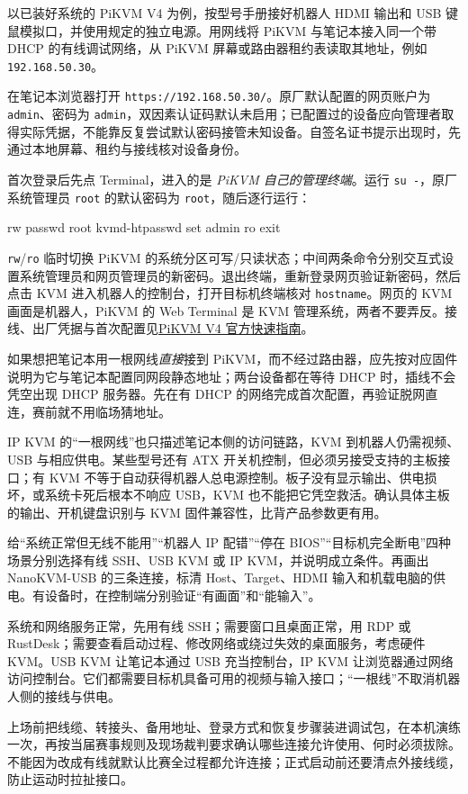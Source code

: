 \begin{example}
以已装好系统的 PiKVM V4 为例，按型号手册接好机器人 HDMI 输出和 USB 键鼠模拟口，并使用规定的独立电源。用网线将 PiKVM 与笔记本接入同一个带 DHCP 的有线调试网络，从 PiKVM 屏幕或路由器租约表读取其地址，例如 \texttt{192.168.50.30}。

在笔记本浏览器打开 \texttt{https://192.168.50.30/}。原厂默认配置的网页账户为 \texttt{admin}、密码为 \texttt{admin}，双因素认证码默认未启用；已配置过的设备应向管理者取得实际凭据，不能靠反复尝试默认密码接管未知设备。自签名证书提示出现时，先通过本地屏幕、租约与接线核对设备身份。

首次登录后先点 Terminal，进入的是 \emph{PiKVM 自己的管理终端}。运行 \texttt{su -}，原厂系统管理员 \texttt{root} 的默认密码为 \texttt{root}，随后逐行运行：
\begin{tbash}
rw
passwd root
kvmd-htpasswd set admin
ro
exit
\end{tbash}
\texttt{rw}/\texttt{ro} 临时切换 PiKVM 的系统分区可写/只读状态；中间两条命令分别交互式设置系统管理员和网页管理员的新密码。退出终端，重新登录网页验证新密码，然后点击 KVM 进入机器人的控制台，打开目标机终端核对 \texttt{hostname}。网页的 KVM 画面是机器人，PiKVM 的 Web Terminal 是 KVM 管理系统，两者不要弄反。接线、出厂凭据与首次配置见\href{https://docs.pikvm.org/v4/}{PiKVM V4 官方快速指南}。

如果想把笔记本用一根网线\emph{直接}接到 PiKVM，而不经过路由器，应先按对应固件说明为它与笔记本配置同网段静态地址；两台设备都在等待 DHCP 时，插线不会凭空出现 DHCP 服务器。先在有 DHCP 的网络完成首次配置，再验证脱网直连，赛前就不用临场猜地址。
\end{example}

IP KVM 的“一根网线”也只描述笔记本侧的访问链路，KVM 到机器人仍需视频、USB 与相应供电。某些型号还有 ATX 开关机控制，但必须另接受支持的主板接口；有 KVM 不等于自动获得机器人总电源控制。板子没有显示输出、供电损坏，或系统卡死后根本不响应 USB，KVM 也不能把它凭空救活。确认具体主板的输出、开机键盘识别与 KVM 固件兼容性，比背产品参数更有用。

\begin{exercise}\label{ex:deploy-kvm}
给“系统正常但无线不能用”“机器人 IP 配错”“停在 BIOS”“目标机完全断电”四种场景分别选择有线 SSH、USB KVM 或 IP KVM，并说明成立条件。再画出 NanoKVM-USB 的三条连接，标清 Host、Target、HDMI 输入和机载电脑的供电。有设备时，在控制端分别验证“有画面”和“能输入”。
\end{exercise}

\begin{conclusion}
系统和网络服务正常，先用有线 SSH；需要窗口且桌面正常，用 RDP 或 RustDesk；需要查看启动过程、修改网络或绕过失效的桌面服务，考虑硬件 KVM。USB KVM 让笔记本通过 USB 充当控制台，IP KVM 让浏览器通过网络访问控制台。它们都需要目标机具备可用的视频与输入接口；“一根线”不取消机器人侧的接线与供电。
\end{conclusion}

上场前把线缆、转接头、备用地址、登录方式和恢复步骤装进调试包，在本机演练一次，再按当届赛事规则及现场裁判要求确认哪些连接允许使用、何时必须拔除。不能因为改成有线就默认比赛全过程都允许连接；正式启动前还要清点外接线缆，防止运动时拉扯接口。
